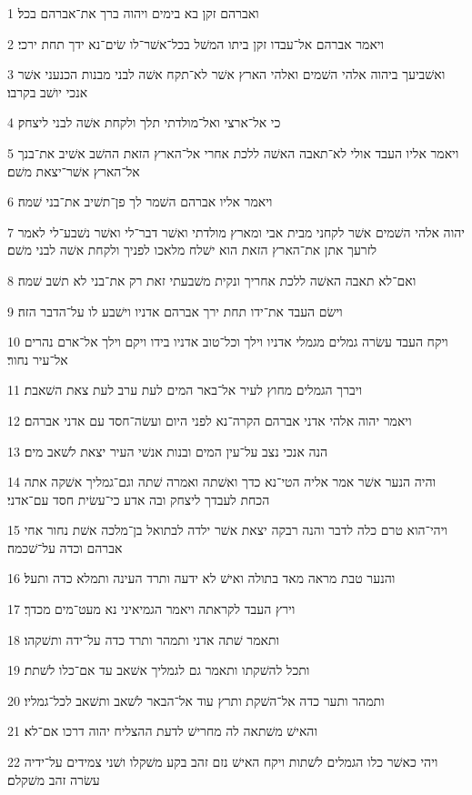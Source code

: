 \par 1 ואברהם זקן בא בימים ויהוה ברך את־אברהם בכל׃
\par 2 ויאמר אברהם אל־עבדו זקן ביתו המשׁל בכל־אשׁר־לו שׂים־נא ידך תחת ירכי׃
\par 3 ואשׁביעך ביהוה אלהי השׁמים ואלהי הארץ אשׁר לא־תקח אשׁה לבני מבנות הכנעני אשׁר אנכי יושׁב בקרבו׃
\par 4 כי אל־ארצי ואל־מולדתי תלך ולקחת אשׁה לבני ליצחק׃
\par 5 ויאמר אליו העבד אולי לא־תאבה האשׁה ללכת אחרי אל־הארץ הזאת ההשׁב אשׁיב את־בנך אל־הארץ אשׁר־יצאת משׁם׃
\par 6 ויאמר אליו אברהם השׁמר לך פן־תשׁיב את־בני שׁמה׃
\par 7 יהוה אלהי השׁמים אשׁר לקחני מבית אבי ומארץ מולדתי ואשׁר דבר־לי ואשׁר נשׁבע־לי לאמר לזרעך אתן את־הארץ הזאת הוא ישׁלח מלאכו לפניך ולקחת אשׁה לבני משׁם׃
\par 8 ואם־לא תאבה האשׁה ללכת אחריך ונקית משׁבעתי זאת רק את־בני לא תשׁב שׁמה׃
\par 9 וישׂם העבד את־ידו תחת ירך אברהם אדניו וישׁבע לו על־הדבר הזה׃
\par 10 ויקח העבד עשׂרה גמלים מגמלי אדניו וילך וכל־טוב אדניו בידו ויקם וילך אל־ארם נהרים אל־עיר נחור׃
\par 11 ויברך הגמלים מחוץ לעיר אל־באר המים לעת ערב לעת צאת השׁאבת׃
\par 12 ויאמר יהוה אלהי אדני אברהם הקרה־נא לפני היום ועשׂה־חסד עם אדני אברהם׃
\par 13 הנה אנכי נצב על־עין המים ובנות אנשׁי העיר יצאת לשׁאב מים׃
\par 14 והיה הנער אשׁר אמר אליה הטי־נא כדך ואשׁתה ואמרה שׁתה וגם־גמליך אשׁקה אתה הכחת לעבדך ליצחק ובה אדע כי־עשׂית חסד עם־אדני׃
\par 15 ויהי־הוא טרם כלה לדבר והנה רבקה יצאת אשׁר ילדה לבתואל בן־מלכה אשׁת נחור אחי אברהם וכדה על־שׁכמה׃
\par 16 והנער טבת מראה מאד בתולה ואישׁ לא ידעה ותרד העינה ותמלא כדה ותעל׃
\par 17 וירץ העבד לקראתה ויאמר הגמיאיני נא מעט־מים מכדך׃
\par 18 ותאמר שׁתה אדני ותמהר ותרד כדה על־ידה ותשׁקהו׃
\par 19 ותכל להשׁקתו ותאמר גם לגמליך אשׁאב עד אם־כלו לשׁתת׃
\par 20 ותמהר ותער כדה אל־השׁקת ותרץ עוד אל־הבאר לשׁאב ותשׁאב לכל־גמליו׃
\par 21 והאישׁ משׁתאה לה מחרישׁ לדעת ההצליח יהוה דרכו אם־לא׃
\par 22 ויהי כאשׁר כלו הגמלים לשׁתות ויקח האישׁ נזם זהב בקע משׁקלו ושׁני צמידים על־ידיה עשׂרה זהב משׁקלם׃
